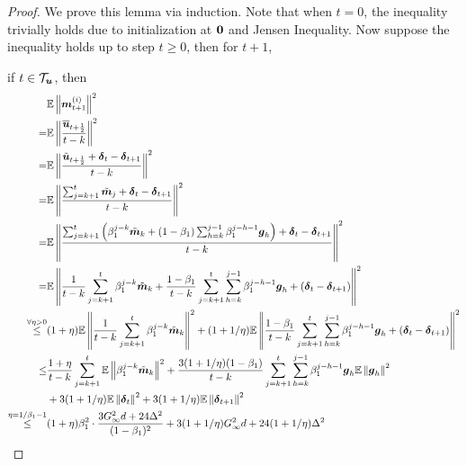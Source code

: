 \begin{proof}
We prove this lemma via induction.
Note that when $t=0$, the inequality trivially holds due to initialization at $\boldsymbol{0}$ and Jensen Inequality. Now suppose the inequality holds up to step $t \geq 0$, then
for $t+1$,

\iffalse
For any $k< j \leq t$,
\begin{align*}
    \*m_j^{(i)} = \beta_1^{j-k}\*m_k^{(i)} + (1-\beta_1)\sum_{h=k}^{j-1}\beta_1^{j-h-1}\*g_h^{(i)}.
\end{align*}
\fi



if $t\in\mathcal{T}_{\boldsymbol{u}}$, then
\begin{align*}
& \mathbb{E}\left\| \*m_{t+1}^{(i)}\right\|^2 \\
= & \mathbb{E}\left\| \frac{\overline{\*u}_{t+\frac{1}{2}}}{t-k} \right\|^2 \\
= & \mathbb{E}\left\| \frac{\tilde{\*u}_{t+\frac{1}{2}} + \*\delta_{t} - \*\delta_{t+1}}{t-k} \right\|^2 \\
= & \mathbb{E}\left\| \frac{\sum_{j=k+1}^{t}\tilde{\*m}_j + \*\delta_{t} - \*\delta_{t+1}}{t-k} \right\|^2 \\
    = & \mathbb{E}\left\| \frac{\sum_{j=k+1}^{t}\left(\beta_1^{j-k}\tilde{\*m}_k + (1-\beta_1)\sum_{h=k}^{j-1}\beta_1^{j-h-1}{\*g}_h \right) + \*\delta_t - \*\delta_{t+1}}{t-k} \right\|^2 \\
= & \mathbb{E}\left\|\frac{1}{t-k}\sum_{j=k+1}^{t}\beta_1^{j-k}\tilde{\*m}_k  + \frac{1-\beta_1}{t-k}\sum_{j=k+1}^{t}\sum_{h=k}^{j-1}\beta_1^{j-h-1}{\*g}_h + \left(\*\delta_t - \*\delta_{t+1} \right) \right\|^2 \\
    \overset{\forall \eta > 0}{\leq} & (1+\eta)\mathbb{E}\left\|\frac{1}{t-k}\sum_{j=k+1}^{t}\beta_1^{j-k}\tilde{\*m}_k \right\|^2 + (1+1/\eta)\mathbb{E}\left\| \frac{1-\beta_1}{t-k}\sum_{j=k+1}^{t}\sum_{h=k}^{j-1}\beta_1^{j-h-1}{\*g}_h + \left(\*\delta_t - \*\delta_{t+1} \right) \right\|^2 \\
\leq & \frac{1+\eta}{t-k}\sum_{j=k+1}^{t}\mathbb{E}\left\|\beta_1^{j-k}\tilde{\*m}_k \right\|^2 + \frac{3(1+1/\eta)(1-\beta_1)}{t-k}\sum_{j=k+1}^{t}\sum_{h=k}^{j-1}\beta_1^{j-h-1}{\*g}_h\mathbb{E}\left\| {\*g}_h \right\|^2 \\
& + 3(1+1/\eta)\mathbb{E}\left\| \*\delta_t\right\|^2 + 3(1+1/\eta)\mathbb{E}\left\| \*\delta_{t+1}\right\|^2 \\
    \overset{\eta=1/\beta_1-1}{\leq} & (1+\eta)\beta_1^2 \cdot \frac{3G_\infty^2d+24\Delta^2}{(1-\beta_1)^2} + 3(1+1/\eta)G_\infty^2d + 24(1+1/\eta)\Delta^2 \\

\end{align*}
\end{proof}

